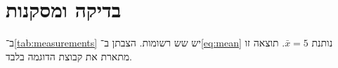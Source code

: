 \section{בדיקה ומסקנות}
ב־\autoref{tab:measurements} יש שש רשומות. הצבתן ב־\eqref{eq:mean} נותנת
$\bar{x}=5$. תוצאה זו מתארת את קבוצת הדוגמה בלבד.

